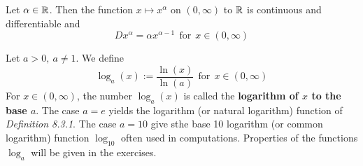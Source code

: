 \begin{theorem}
	Let $\alpha \in \mathbb{R}$. Then the function $x \mapsto x^\alpha$ on $(0,\infty)$ to $\mathbb{R}$ is continuous and differentiable and
	\[Dx^\alpha = \alpha x^{\alpha - 1}\ \ \text{for}\ \ x \in (0, \infty)\]
\end{theorem}

\begin{definition}
	Let $a>0,\ a \neq 1$. We define
	\[\log_a(x) := \frac{\ln(x)}{\ln(a)}\ \ \text{for}\ \ x \in (0,\infty)\]
	For $x \in (0,\infty)$, the number $\log_a(x)$ is called the \textbf{logarithm of $x$ to the base $a$}. The case $a=e$ yields the logarithm (or natural logarithm) function of \textit{Definition 8.3.1}. The case $a=10$ give sthe base 10 logarithm (or common logarithm) function $\log_{10}$ often used in computations. Properties of the functions $\log_a$ will be given in the exercises.
\end{definition}
